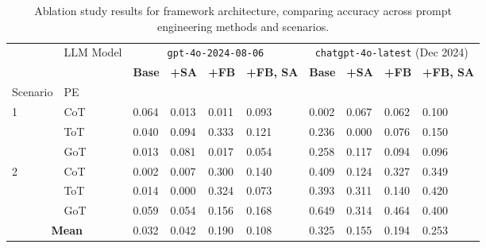 \begin{table*}[!t]
\caption{Ablation study results for framework architecture, comparing accuracy across prompt engineering methods and scenarios.}
\label{tab:result_pe}
\begin{tabular}{p{1.5cm}p{1.5cm}|p{1.3cm}p{1.3cm}p{1.3cm}p{1.3cm}|p{1.3cm}p{1.3cm}p{1.3cm}p{1.3cm}}
\toprule
 & LLM Model & \multicolumn{4}{c|}{\texttt{gpt-4o-2024-08-06}} & \multicolumn{4}{c}{\texttt{chatgpt-4o-latest} (Dec 2024)} \\
 &  & \textbf{Base} & \textbf{+SA} & \textbf{+FB} & \textbf{+FB, SA} & \textbf{Base} & \textbf{+SA} & \textbf{+FB} & \textbf{+FB, SA} \\
Scenario & PE &  &  &  &  &  &  &  &  \\
\midrule
\multirow[t]{3}{*}{1} & CoT & 0.064 & 0.013 & 0.011 & 0.093 & 0.002 & 0.067 & 0.062 & 0.100 \\
 & ToT & 0.040 & 0.094 & 0.333 & 0.121 & 0.236 & 0.000 & 0.076 & 0.150 \\
 & GoT & 0.013 & 0.081 & 0.017 & 0.054 & 0.258 & 0.117 & 0.094 & 0.096 \\
\midrule
\multirow[t]{3}{*}{2} & CoT & 0.002 & 0.007 & 0.300 & 0.140 & 0.409 & 0.124 & 0.327 & 0.349 \\
 & ToT & 0.014 & 0.000 & 0.324 & 0.073 & 0.393 & 0.311 & 0.140 & 0.420 \\
 & GoT & 0.059 & 0.054 & 0.156 & 0.168 & 0.649 & 0.314 & 0.464 & 0.400 \\
\midrule
\multicolumn{2}{c|}{\textbf{Mean}} & 0.032 & 0.042 & 0.190 & 0.108 & 0.325 & 0.155 & 0.194 & 0.253 \\
\bottomrule
\end{tabular}
\end{table*}